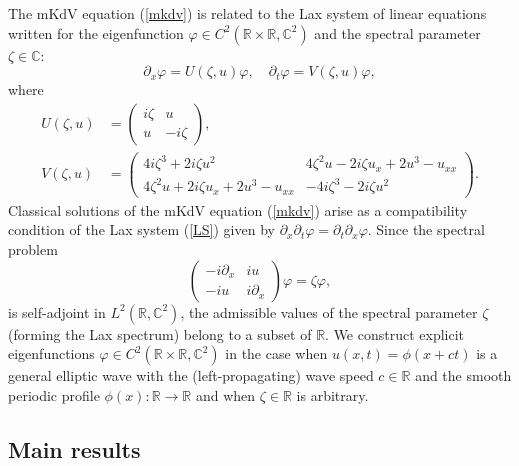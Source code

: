 \documentclass[12pt,reqno]{amsart}
\numberwithin{equation}{section}
\begin{document}
The mKdV equation (\ref{mkdv}) is related to the Lax system of linear equations written for the eigenfunction $\varphi \in C^2(\mathbb{R} \times \mathbb{R},\mathbb{C}^2)$ and the spectral parameter $\zeta \in \mathbb{C}$:
\begin{equation}
\label{LS}
\partial_x \varphi = U(\zeta,u) \varphi, \quad  
\partial_t \varphi = V(\zeta,u) \varphi, 
\end{equation}
where 
\begin{align*}
U(\zeta,u) &=\left(\begin{array}{ll} i\zeta & u\\ u & -i\zeta\end{array} \right), \\
V(\zeta,u)  &= \left( \begin{array}{ll} 4i\zeta^3+2i\zeta u^2 & 4\zeta^2u-2i\zeta u_x+2u^3-u_{xx}\\ 4\zeta^2u+2i\zeta u_x+2u^3-u_{xx} & -4i\zeta^3-2i\zeta u^2 \end{array}\right).
\end{align*}
Classical solutions of the mKdV equation (\ref{mkdv}) arise as a compatibility condition of the Lax system (\ref{LS}) given by $\partial_x \partial_t \varphi = \partial_t \partial_x \varphi$. Since the spectral problem 
\begin{equation}
\label{spectral-problem}
\left(\begin{array}{ll} -i \partial_x & i u\\ -i u & i \partial_x \end{array} \right) \varphi = \zeta \varphi,
\end{equation}
is self-adjoint in $L^2(\mathbb{R},\mathbb{C}^2)$, the admissible values of the spectral parameter $\zeta$ (forming the Lax spectrum) belong to a subset of $\mathbb{R}$. We construct explicit eigenfunctions $\varphi \in C^2(\mathbb{R} \times \mathbb{R},\mathbb{C}^2)$ in the case when $u(x,t) = \phi(x+ct)$ is a general elliptic wave with the (left-propagating) wave speed $c \in \mathbb{R}$ and the smooth periodic profile $\phi(x) : \mathbb{R}\to \mathbb{R}$ and when $\zeta \in \mathbb{R}$ is arbitrary.

\subsection{Main results} 
\end{document}
